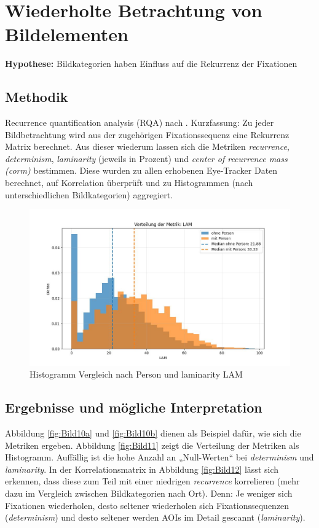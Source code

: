 \documentclass[
    language=german, %
    thesis=seminar, %
    supervisor=postdoc, %
    multiauthor=true, %
    ]{settings/csssa-thesis}
\begin{document}
\section{Wiederholte Betrachtung von Bildelementen}

\textbf{Hypothese:} Bildkategorien haben Einfluss auf die Rekurrenz der Fixationen 

\subsection{Methodik}
Recurrence quantification analysis (RQA) nach \citeauthor{Anderson2013-oj}. 
Kurzfassung: Zu jeder Bildbetrachtung wird aus der zugehörigen Fixationssequenz 
eine Rekurrenz Matrix berechnet. Aus dieser wiederum lassen sich die Metriken \textit{recurrence}, 
\textit{determinism}, \textit{laminarity} (jeweils in Prozent) und \textit{center of recurrence mass (corm)} bestimmen. 
Diese wurden zu allen erhobenen Eye-Tracker Daten berechnet, auf Korrelation überprüft 
und zu Histogrammen (nach unterschiedlichen Bildkategorien) aggregiert.

\begin{figure}[h]
    \centering
    \includegraphics[width=\linewidth,height=0.8\textheight,keepaspectratio]{figures/Bild23.jpeg}
    \caption{Histogramm Vergleich nach Person und laminarity LAM}\label{fig:bild19}
\end{figure}

\subsection{Ergebnisse und mögliche Interpretation}
Abbildung \ref{fig:Bild10a} und \ref{fig:Bild10b} dienen als Beispiel dafür, wie sich die Metriken ergeben. 
Abbildung \ref{fig:Bild11} zeigt die Verteilung der Metriken als Histogramm. Auffällig ist 
die hohe Anzahl an „Null-Werten“ bei \textit{determinism} und \textit{laminarity}. 
In der Korrelationsmatrix in Abbildung \ref{fig:Bild12} lässt sich erkennen, dass diese zum 
Teil mit einer niedrigen \textit{recurrence} korrelieren (mehr dazu im Vergleich zwischen Bildkategorien nach Ort). 
Denn: Je weniger sich Fixationen wiederholen, desto seltener wiederholen sich 
Fixationssequenzen (\textit{determinism}) und desto seltener werden AOIs im Detail gescannt (\textit{laminarity}). 
\end{document}
